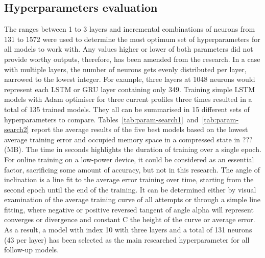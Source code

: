 %
%
\subsection{Hyperparameters evaluation}
The ranges between 1 to 3 layers and incremental combinations of neurons from 131 to 1572 were used to determine the most optimum set of hyperparameters for all models to work with.
Any values higher or lower of both parameters did not provide worthy outputs, therefore, has been amended from the research.
In a case with multiple layers, the number of neurons gets evenly distributed per layer, narrowed to the lowest integer.
For example, three layers at 1048 neurons would represent each LSTM or GRU layer containing only 349.
Training simple LSTM models with Adam optimiser for three current profiles three times resulted in a total of 135 trained models.
They all can be summarised in 15 different sets of hyperparameters to compare.
\mbox{Tables~\ref{tab:param-search1} and~\ref{tab:param-search2}} report the average results of the five best models based on the lowest average training error and occupied memory space in a compressed state in ??? (MB).
The time in seconds highlights the duration of training over a single epoch.
For online training on a low-power device, it could be considered as an essential factor, sacrificing some amount of accuracy, but not in this research.
The angle of inclination is a line fit to the average error training over time, starting from the second epoch until the end of the training.
It can be determined either by visual examination of the average training curve of all attempts or through a simple line fitting, where negative or positive reversed tangent of angle alpha will represent converges or divergence and constant C the height of the curve or average error.
%
As a result, a model with index 10 with three layers and a total of 131 neurons (43 per layer) has been selected as the main researched hyperparameter for all follow-up models.
